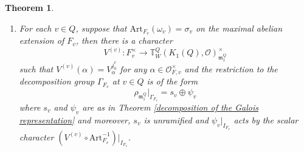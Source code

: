 \documentclass[12pt,oneside,reqno]{amsart}
\theoremstyle{plain}
\newtheorem{theorem}{Theorem}[section]
\begin{document}
\begin{theorem}
\begin{enumerate}
			
			\item 
			For each
			$v\in Q$,
			suppose that
			$\mathrm{Art}_{F_v}(\omega_v)=\sigma_v$
			on the maximal abelian extension of
			$F_v$, then  		
			there is a character
			\[
			V^{(v)}
			\colon
			F_v^\times
			\rightarrow
			\mathbb{T}^{Q}_W
			(K_1(Q),\mathcal{O})_{\mathfrak{m}_1^Q}^\times
			\]		
			such that
			$V^{(v)}(\alpha)=V_\alpha^{j_0^v}$
			for any
			$\alpha\in\mathcal{O}_{F,v}^\times$
			and
			the restriction to the decomposition group
			$\Gamma_{F_v}$ at $v\in Q$
			is of the form
			\[
			\rho_{\mathfrak{m}_1^Q}
			|_{\Gamma_{F_v}}
			=
			s_v
			\oplus
			\psi_v
			\]
			where
			$s_v$ and
			$\psi_v$ are
			as in
			Theorem
			\ref{decomposition of the Galois representation}
			and moreover, $s_v$ is unramified and
			$\psi_v|_{I_{F_v}}$
			acts by the scalar character
			$
			\left(
			V^{(v)}\circ\mathrm{Art}_{F_v}^{-1}
			\right)
			|_{I_{F_v}}$.
		\end{enumerate}
	\end{theorem}
\end{document}

